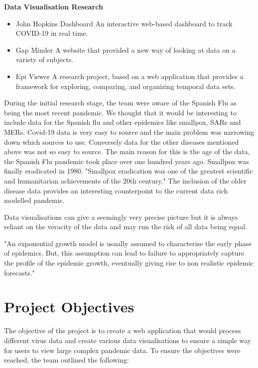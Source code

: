 \textbf{Data Visualisation Research}
\begin{itemize}
    \item John Hopkins Dashboard
            An interactive web-based dashboard to track COVID-19 in real time.
    \item Gap Minder
            A website that provided a new way of looking at data on a variety of subjects.
    \item Epi Viewer
            A research project, based on a web application that provides a framework for exploring, comparing, and organizing temporal data sets.
    
\end{itemize}

During the initial research stage, the team were aware of the Spanish Flu as being the most recent pandemic. We thought that it would be interesting to include data for the Spanish flu and other epidemics like smallpox, SARs and MERs. 
Covid-19 data is very easy to source and the main problem was narrowing down which sources to use.
Conversely data for the other diseases mentioned above was not so easy to source. The main reason for this is the age of the data, the Spanish Flu pandemic took place over one hundred years ago. Smallpox was finally eradicated in 1980. 
"Smallpox eradication was one of the greatest scientific and humanitarian achievements of the 20th century."\cite{Smallpox}
The inclusion of the older disease data provides an interesting counterpoint to the current data rich modelled pandemic.

Data visualisations can give a seemingly very precise picture but it is always reliant on the veracity of the data and may run the risk of all data being equal.

"An exponential growth model is usually assumed to characterise the early phase of epidemics. But, this assumption can lead to failure to appropriately capture the profile of the epidemic growth, eventually giving rise to non realistic epidemic forecasts."\cite{tovissode2020use}



\section{Project Objectives}
The objective of the project is to create a web application that would process different virus data and create various data visualisations to ensure a simple way for users to view large complex pandemic data. 
To ensure the objectives were reached, the team outlined the following:

